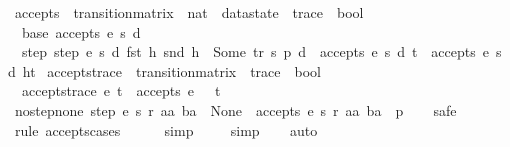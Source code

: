 \begin{isabellebody}
\isanewline
{}\isamarkupfalse%
%
\endisatagproof
{\isafoldproof}%
%
\isadelimproof
\isanewline
%
\endisadelimproof
\isanewline
{}\isamarkupfalse%
\ accepts\ {\isacharcolon}{\isacharcolon}\ {\isachardoublequoteopen}transition{\isacharunderscore}matrix\ {\isasymRightarrow}\ nat\ {\isasymRightarrow}\ datastate\ {\isasymRightarrow}\ trace\ {\isasymRightarrow}\ bool{\isachardoublequoteclose}\ \isanewline
\ \ base{\isacharcolon}\ {\isachardoublequoteopen}accepts\ e\ s\ d\ {\isacharbrackleft}{\isacharbrackright}{\isachardoublequoteclose}\ {\isacharbar}\isanewline
\ \ step{\isacharcolon}\ {\isachardoublequoteopen}step\ e\ s\ d\ {\isacharparenleft}fst\ h{\isacharparenright}\ {\isacharparenleft}snd\ h{\isacharparenright}\ {\isacharequal}\ Some\ {\isacharparenleft}tr{\isacharcomma}\ s{\isacharprime}{\isacharcomma}\ p{\isacharprime}{\isacharcomma}\ d{\isacharprime}{\isacharparenright}\ {\isasymLongrightarrow}\ accepts\ e\ s{\isacharprime}\ d{\isacharprime}\ t\ {\isasymLongrightarrow}\ accepts\ e\ s\ d\ {\isacharparenleft}h{\isacharhash}t{\isacharparenright}{\isachardoublequoteclose}\isanewline
\isanewline
{}\isamarkupfalse%
\ accepts{\isacharunderscore}trace\ {\isacharcolon}{\isacharcolon}\ {\isachardoublequoteopen}transition{\isacharunderscore}matrix\ {\isasymRightarrow}\ trace\ {\isasymRightarrow}\ bool{\isachardoublequoteclose}\ \isanewline
\ \ {\isachardoublequoteopen}accepts{\isacharunderscore}trace\ e\ t\ {\isacharequal}\ accepts\ e\ {}\ {\isacharless}{\isachargreater}\ t{\isachardoublequoteclose}\isanewline
\isanewline
{}\isamarkupfalse%
\ no{\isacharunderscore}step{\isacharunderscore}none{\isacharcolon}\ {\isachardoublequoteopen}step\ e\ s\ r\ aa\ ba\ {\isacharequal}\ None\ {\isasymLongrightarrow}\ {\isasymnot}accepts\ e\ s\ r\ {\isacharparenleft}{\isacharparenleft}aa{\isacharcomma}\ ba{\isacharparenright}\ {\isacharhash}\ p{\isacharparenright}{\isachardoublequoteclose}\isanewline
%
\isadelimproof
\ \ %
\endisadelimproof
%
\isatagproof
{}\isamarkupfalse%
\ safe\isanewline
\ \ \isamarkupfalse%
\ {\isacharparenleft}rule\ accepts{\isachardot}cases{\isacharparenright}\isanewline
\ \ \ \ \isamarkupfalse%
\ simp\isanewline
\ \ \ \isamarkupfalse%
\ simp\isanewline
\ \ \isamarkupfalse%
\ auto%
\endisatagproof
{\isafoldproof}%
%
\isadelimproof
\isanewline
%
\endisadelimproof
\isanewline
{}\isamarkupfalse%

\end{isabellebody}
